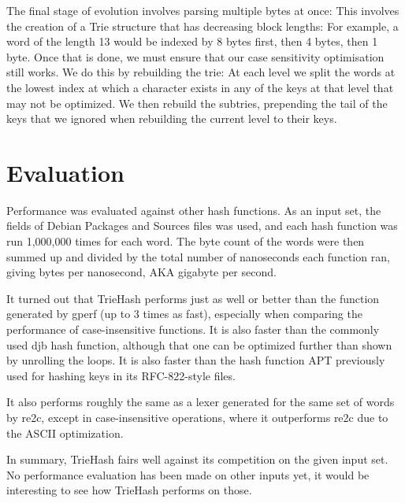 \documentclass[parskip=half]{scrartcl}
\begin{document}
    The final stage of evolution involves parsing multiple bytes at once: This
    involves the creation of a Trie structure that has decreasing block lengths:
    For example, a word of the length 13 would be indexed by 8 bytes first, then
    4 bytes, then 1 byte. Once that is done, we must ensure that our case sensitivity
    optimisation still works. We do this by rebuilding the trie: At each level
    we split the words at the lowest index at which a character exists in any
    of the keys at that level that may not be optimized. We then rebuild the
    subtries, prepending the tail of the keys that we ignored when rebuilding
    the current level to their keys.

    
    
    \section{Evaluation}
Performance was evaluated against other hash functions. As an input set,
the fields of Debian Packages and Sources files was used, and each hash
function was run 1,000,000 times for each word. The byte count of the
words were then summed up and divided by the total number of nanoseconds
each function ran, giving bytes per nanosecond, AKA gigabyte per second.

It turned out that TrieHash performs just as well or better than the function
generated by gperf (up to 3 times as fast), especially when comparing the performance
of case-insensitive functions. It is also faster than the commonly used djb hash
function, although that one can be optimized further than shown by unrolling
the loops. It is also faster than the hash function APT previously used for
hashing keys in its RFC-822-style files.

It also performs roughly the same as a lexer generated for the same set of
words by re2c, except in case-insensitive operations, where it outperforms
re2c due to the ASCII optimization.

In summary, TrieHash fairs well against its competition on the given input
set. No performance evaluation has been made on other inputs yet, it would
be interesting to see how TrieHash performs on those.



    
    

\clearpage
\appendix{}
\end{document}
